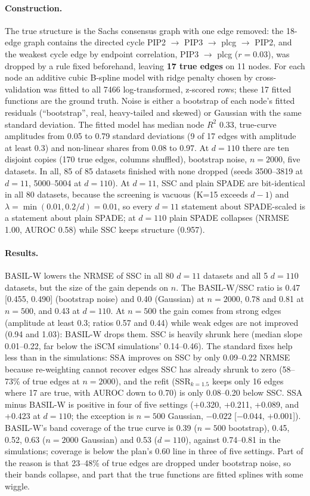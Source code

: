\paragraph{Construction.} The true structure is the Sachs consensus graph with one edge removed: the 18-edge graph contains the directed cycle PIP2 $\to$ PIP3 $\to$ plcg $\to$ PIP2, and the weakest cycle edge by endpoint correlation, PIP3 $\to$ plcg ($r=0.03$), was dropped by a rule fixed beforehand, leaving \textbf{17 true edges} on 11 nodes. For each node an additive cubic B-spline model with ridge penalty chosen by cross-validation was fitted to all 7466 log-transformed, z-scored rows; these 17 fitted functions are the ground truth. Noise is either a bootstrap of each node's fitted residuals (``bootstrap'', real, heavy-tailed and skewed) or Gaussian with the same standard deviation. The fitted model has median node $R^2$ 0.33, true-curve amplitudes from 0.05 to 0.79 standard deviations (9 of 17 edges with amplitude at least 0.3) and non-linear shares from 0.08 to 0.97. At $d=110$ there are ten disjoint copies (170 true edges, columns shuffled), bootstrap noise, $n=2000$, five datasets. In all, 85 of 85 datasets finished with none dropped (seeds 3500--3819 at $d=11$, 5000--5004 at $d=110$). At $d=11$, SSC and plain SPADE are bit-identical in all 80 datasets, because the screening is vacuous (K=15 exceeds $d-1$) and $\lambda=\min(0.01,0.2/d)=0.01$, so every $d=11$ statement about SPADE-scaled is a statement about plain SPADE; at $d=110$ plain SPADE collapses (NRMSE 1.00, AUROC 0.58) while SSC keeps structure (0.957).

\paragraph{Results.} BASIL-W lowers the NRMSE of SSC in all 80 $d=11$ datasets and all 5 $d=110$ datasets, but the size of the gain depends on $n$. The BASIL-W/SSC ratio is 0.47 [0.455, 0.490] (bootstrap noise) and 0.40 (Gaussian) at $n=2000$, 0.78 and 0.81 at $n=500$, and 0.43 at $d=110$. At $n=500$ the gain comes from strong edges (amplitude at least 0.3; ratios 0.57 and 0.44) while weak edges are not improved (0.94 and 1.03): BASIL-W drops them. SSC is heavily shrunk here (median slope 0.01--0.22, far below the iSCM simulations' 0.14--0.46). The standard fixes help less than in the simulations: SSA improves on SSC by only 0.09--0.22 NRMSE because re-weighting cannot recover edges SSC has already shrunk to zero (58--73\% of true edges at $n=2000$), and the refit (SSR$_{k=1.5}$ keeps only 16 edges where 17 are true, with AUROC down to 0.70) is only 0.08--0.20 below SSC. SSA minus BASIL-W is positive in four of five settings (+0.320, +0.211, +0.089, and +0.423 at $d=110$; the exception is $n=500$ Gaussian, $-0.022$ [$-0.044$, $+0.001$]). BASIL-W's band coverage of the true curve is 0.39 ($n=500$ bootstrap), 0.45, 0.52, 0.63 ($n=2000$ Gaussian) and 0.53 ($d=110$), against 0.74--0.81 in the simulations; coverage is below the plan's 0.60 line in three of five settings. Part of the reason is that 23--48\% of true edges are dropped under bootstrap noise, so their bands collapse, and part that the true functions are fitted splines with some wiggle.

